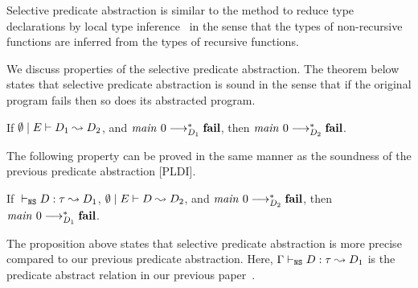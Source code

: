 Selective predicate abstraction is similar to the method to reduce type
declarations by local type inference~\cite{} in the sense that the types
of non-recursive functions are inferred from the types of recursive functions.

We discuss properties of the selective predicate abstraction.
The theorem below states that selective predicate abstraction is sound
in the sense that if the original program fails then so does its
abstracted program.

\begin{theorem}[soundness]
 If ${\emptyset} \mid {E} \vdash {D_1} \leadsto {D_2}$, and
 ${\mathit{main}}~{0} \longrightarrow_{D_1}^* \mathbf{fail}$, then
 ${\mathit{main}}~{0} \longrightarrow_{D_2}^* \mathbf{fail}$.
\end{theorem}


The following property can be proved in the same manner as the soundness of the previous predicate abstraction [PLDI].

\begin{proposition}
 If ${} \vdash_{\texttt{NS}} {D} : {\tau} \leadsto {D_1}$,
 ${\emptyset} \mid {E} \vdash {D} \leadsto {D_2}$, and
 ${\mathit{main}}~{0} \longrightarrow_{D_2}^* \mathbf{fail}$, then
 ${\mathit{main}}~{0} \longrightarrow_{D_1}^* \mathbf{fail}$.
\end{proposition}

The proposition above states that selective predicate abstraction is
more precise compared to our previous predicate abstraction.  Here,
${\Gamma} \vdash_{\texttt{NS}} {D} : {\tau} \leadsto {D_1}$ is the predicate abstract relation in
our previous paper~\cite{KobayashiPLDI2011}.


